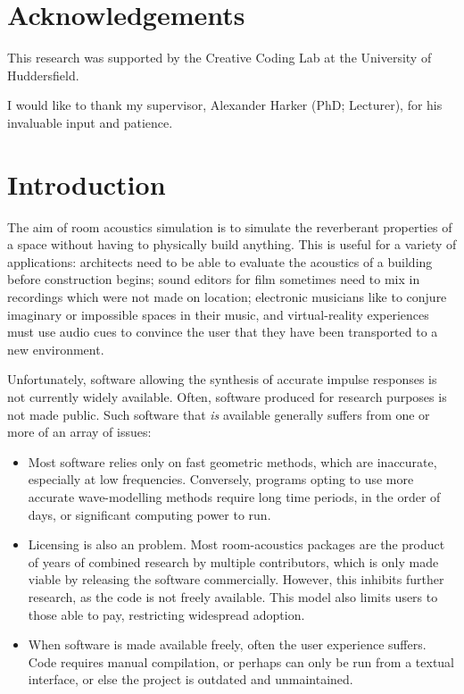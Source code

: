 \documentclass[]{scrreprt}
\providecommand{\tightlist}{%
  \setlength{\itemsep}{0pt}\setlength{\parskip}{0pt}}
\begin{document}
{
\hypersetup{linkcolor=black}
\setcounter{tocdepth}{2}
\tableofcontents
}
\chapter*{Acknowledgements}

This research was supported by the Creative Coding Lab at the University
of Huddersfield.

I would like to thank my supervisor, Alexander Harker (PhD; Lecturer),
for his invaluable input and patience.

\chapter*{Introduction}\label{introduction}

The aim of room acoustics simulation is to simulate the reverberant
properties of a space without having to physically build anything. This
is useful for a variety of applications: architects need to be able to
evaluate the acoustics of a building before construction begins; sound
editors for film sometimes need to mix in recordings which were not made
on location; electronic musicians like to conjure imaginary or
impossible spaces in their music, and virtual-reality experiences must
use audio cues to convince the user that they have been transported to a
new environment.

Unfortunately, software allowing the synthesis of accurate impulse
responses is not currently widely available. Often, software produced
for research purposes is not made public. Such software that \emph{is}
available generally suffers from one or more of an array of issues:

\begin{itemize}
\tightlist
\item
  Most software relies only on fast geometric methods, which are
  inaccurate, especially at low frequencies. Conversely, programs opting
  to use more accurate wave-modelling methods require long time periods,
  in the order of days, or significant computing power to run.
\item
  Licensing is also an problem. Most room-acoustics packages are the
  product of years of combined research by multiple contributors, which
  is only made viable by releasing the software commercially. However,
  this inhibits further research, as the code is not freely available.
  This model also limits users to those able to pay, restricting
  widespread adoption.
\item
  When software is made available freely, often the user experience
  suffers. Code requires manual compilation, or perhaps can only be run
  from a textual interface, or else the project is outdated and
  unmaintained.
\end{itemize}
\end{document}
